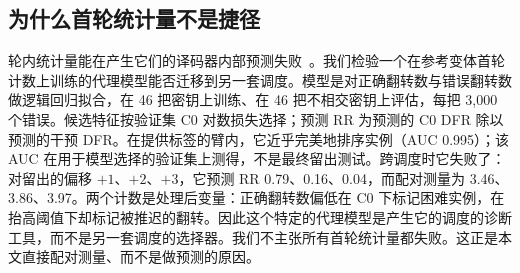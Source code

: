 \subsection{为什么首轮统计量不是捷径}\label{sec:counterfactual}

轮内统计量能在产生它们的译码器内部预测失败~\cite{kim2021logistic,paiva2022pickyfix}。我们检验一个在参考变体首轮计数上训练的代理模型能否迁移到另一套调度。模型是对正确翻转数与错误翻转数做逻辑回归拟合，在 46 把密钥上训练、在 46 把不相交密钥上评估，每把 3,000 个错误。候选特征按验证集 C0 对数损失选择；预测 RR 为预测的 C0 DFR 除以预测的干预 DFR。在提供标签的臂内，它近乎完美地排序实例（AUC 0.995）；该 AUC 在用于模型选择的验证集上测得，不是最终留出测试。跨调度时它失败了：对留出的偏移 $+1$、$+2$、$+3$，它预测 RR 0.79、0.16、0.04，而配对测量为 3.46、3.86、3.97。两个计数是处理后变量：正确翻转数偏低在 C0 下标记困难实例，在抬高阈值下却标记被推迟的翻转。因此这个特定的代理模型是产生它的调度的诊断工具，而不是另一套调度的选择器。我们不主张所有首轮统计量都失败。这正是本文直接配对测量、而不是做预测的原因。
